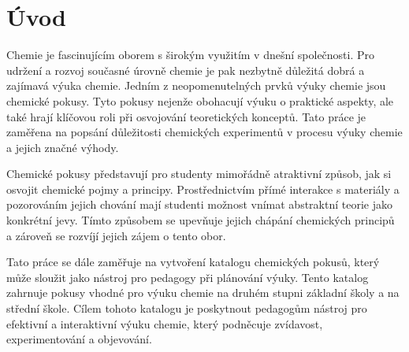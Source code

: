 \chapter*{Úvod}

Chemie je fascinujícím oborem s širokým využitím v dnešní společnosti. Pro udržení a rozvoj současné úrovně chemie je pak nezbytně důležitá dobrá a zajímavá výuka chemie. Jedním z neopomenutelných prvků výuky chemie jsou chemické pokusy. Tyto pokusy nejenže obohacují výuku o praktické aspekty, ale také hrají klíčovou roli při osvojování teoretických konceptů. Tato práce je zaměřena na popsání důležitosti chemických experimentů v procesu výuky chemie a jejich značné výhody.

Chemické pokusy představují pro studenty mimořádně atraktivní způsob, jak si osvojit chemické pojmy a principy. Prostřednictvím přímé interakce s materiály a pozorováním jejich chování mají studenti možnost vnímat abstraktní teorie jako konkrétní jevy. Tímto způsobem se upevňuje jejich chápání chemických principů a zároveň se rozvíjí jejich zájem o tento obor.

Tato práce se dále zaměřuje na vytvoření katalogu chemických pokusů, který může sloužit jako nástroj pro pedagogy při plánování výuky. Tento katalog zahrnuje pokusy vhodné pro výuku chemie na druhém stupni základní školy a na střední škole. Cílem tohoto katalogu je poskytnout pedagogům nástroj pro efektivní a interaktivní výuku chemie, který podněcuje zvídavost, experimentování a objevování.
\newpage
